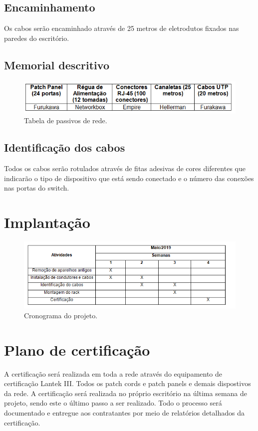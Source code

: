 \documentclass[	DIV=calc,%
							paper=a4,%
							fontsize=12pt,%
							onecolumn]{scrartcl}	 					%
\begin{document}
\subsection{Encaminhamento}
Os cabos serão encaminhado através de 25 metros de eletrodutos fixados nas paredes do escritório.

\subsection{Memorial descritivo}

\begin{figure}[h]
	\centering
	\includegraphics[scale=0.6]{tab}
	\caption{Tabela de passivos de rede.}
	\label{tab}
\end{figure}

\subsection{Identificação dos cabos}
Todos os cabos serão rotulados através de fitas adesivas de cores diferentes que indicarão o tipo de dispositivo que está sendo conectado e o número das conexões nas portas do switch.

\section{Implantação}
\begin{figure}[h]
	\centering
	\includegraphics[scale=0.6]{crono}
	\caption{Cronograma do projeto.}
	\label{crono}
\end{figure} 

\section{Plano de certificação}
A certificação será realizada em toda a rede através do equipamento de certificação Lantek III. Todos os patch cords e patch panels e demais dispostivos da rede. A certificação será realizada no próprio escritório na última semana de projeto, sendo este o último passo a ser realizado. Todo o processo será documentado e entregue aos contratantes por meio de relatórios detalhados da certificação.  
\end{document}
